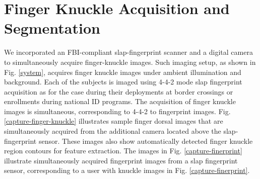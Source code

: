 \section{Finger Knuckle Acquisition and Segmentation\label{fk-acquire}}

We incorporated an FBI-compliant slap-fingerprint scanner and a digital camera to simultaneously acquire finger-knuckle images. Such imaging setup, as shown in Fig. \ref{system}, acquires finger knuckle images under ambient illumination and background. Each of the subjects is imaged using 4-4-2 mode slap fingerprint acquisition \cite{watson2009slapssegii} as for the case during their deployments at border crossings or enrollments during national ID programs. The acquisition of finger knuckle images is simultaneous, corresponding to 4-4-2 to fingerprint images. Fig. \ref{capture-finger-knuckle} illustrates sample finger dorsal images that are simultaneously acquired from the additional camera located above the slap-fingerprint sensor. These images also show automatically detected finger knuckle region contours for feature extraction. The images in Fig. \ref{capture-finerprint} illustrate simultaneously acquired fingerprint images from a slap fingerprint sensor, corresponding to a user with knuckle images in Fig. \ref{capture-finerprint}.


